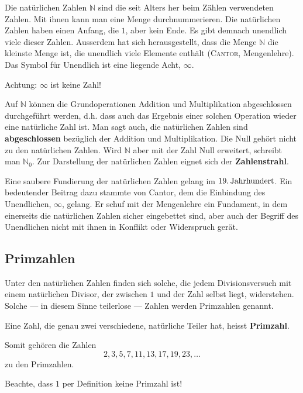 \documentclass[%
11pt,%
twoside,%
titlepage,%
german,%
headsepline%
]{scrartcl}
\begin{document}
Die natürlichen Zahlen $\mathbb{N}$ sind die seit Alters her beim Zählen verwendeten Zahlen.
Mit ihnen kann man eine Menge durchnummerieren. Die natürlichen Zahlen haben einen Anfang, die $1$, aber kein Ende. Es gibt demnach unendlich viele dieser Zahlen. Ausserdem hat sich herausgestellt, dass die Menge $\mathbb{N}$ die kleinste Menge ist, die unendlich viele Elemente enthält (\textsc{Cantor}, Mengenlehre). Das Symbol für Unendlich ist eine liegende Acht, $\infty$.
\begin{bem}
Achtung: $\infty$ ist keine Zahl!
\end{bem}
Auf $\mathbb{N}$ können die Grundoperationen Addition und Multiplikation abgeschlossen durchgeführt werden, d.h. dass auch das Ergebnis einer solchen Operation wieder eine natürliche Zahl ist. Man sagt auch, die natürlichen Zahlen sind \textbf{abgeschlossen} bezüglich der Addition und Multiplikation.
Die Null gehört nicht zu den natürlichen Zahlen. Wird $\mathbb{N}$ aber mit der Zahl Null erweitert, schreibt man $\mathbb{N}_0$.
Zur Darstellung der natürlichen Zahlen eignet sich der \textbf{Zahlenstrahl}.
\begin{center}
\end{center}
Eine saubere Fundierung der natürlichen Zahlen gelang im $\unit[19.]{Jahrhundert}$. Ein bedeutender Beitrag dazu stammte von Cantor, dem die Einbindung des Unendlichen, $\infty$, gelang.
Er schuf mit der Mengenlehre ein Fundament, in dem einerseits die natürlichen Zahlen sicher eingebettet sind, aber auch der Begriff des Unendlichen nicht mit ihnen in Konflikt oder Widerspruch gerät.

\subsection{Primzahlen}

Unter den natürlichen Zahlen finden sich solche, die jedem Divisionsversuch mit einem natürlichen Divisor, der zwischen $1$ und der Zahl selbst liegt, widerstehen. Solche --- in diesem Sinne teilerlose --- Zahlen werden Primzahlen genannt.
\begin{cdef}[Primzahl]{}
Eine Zahl, die genau zwei verschiedene, natürliche Teiler hat, heisst \textbf{Primzahl}.
\end{cdef}
Somit gehören die Zahlen
$$2,3,5,7,11,13,17,19,23,\dots$$
zu den Primzahlen.
\begin{bem}
Beachte, dass $1$ per Definition keine Primzahl ist!
\end{bem}
\end{document}
